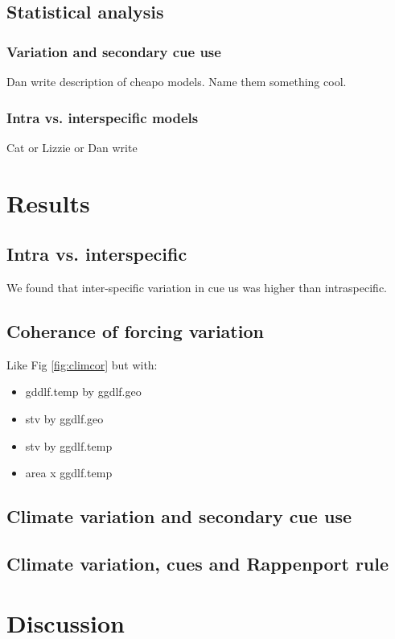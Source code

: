 \documentclass[11pt]{article}\usepackage[]{graphicx}\usepackage[]{color}
\begin{document}
\subsection*{Statistical analysis}
\subsubsection*{Variation and secondary cue use}
Dan write description of cheapo models. Name them something cool. 
\subsubsection*{Intra vs. interspecific models}
Cat or Lizzie or Dan write

\section*{Results}
\subsection*{Intra vs. interspecific}
We found that inter-specific variation in cue us was higher than intraspecific.

\subsection*{Coherance of forcing variation}
Like Fig \ref{fig:climcor} but with:
\begin{itemize}
\item gddlf.temp by ggdlf.geo
\item stv by ggdlf.geo
\item stv by ggdlf.temp
\item area x ggdlf.temp
\end{itemize}

\subsection*{Climate variation and secondary cue use}

\subsection*{Climate variation, cues and Rappenport rule}

\section*{Discussion}
\end{document}
